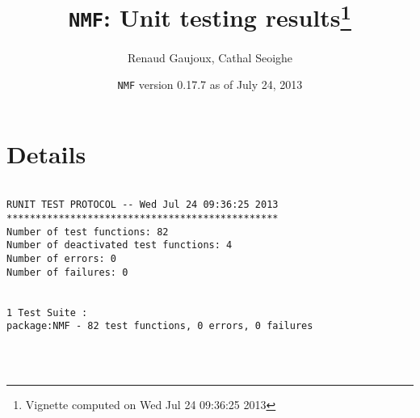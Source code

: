 \documentclass[10pt]{article}\usepackage{graphicx, color}
\author{Renaud Gaujoux, Cathal Seoighe}
\title{\texttt{NMF}: Unit testing results\footnote{Vignette computed  on Wed Jul 24 09:36:25 2013}}
\date{\texttt{NMF} version 0.17.7 as of July 24, 2013}
\begin{document}
\maketitle

\section{Details}
\begin{verbatim}

RUNIT TEST PROTOCOL -- Wed Jul 24 09:36:25 2013 
*********************************************** 
Number of test functions: 82 
Number of deactivated test functions: 4 
Number of errors: 0 
Number of failures: 0 

 
1 Test Suite : 
package:NMF - 82 test functions, 0 errors, 0 failures




\end{verbatim}
\end{document}
